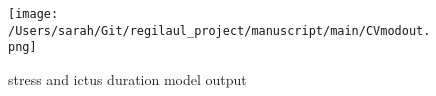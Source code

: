 



%




%
%


\begin{wrapfigure}{L}{0.5\textwidth}
\centering
\texttt{[image: /Users/sarah/Git/regilaul\_project/manuscript/main/CVmodout.png]}

\caption{stress and ictus duration model output}
\label{strickmdl}
\end{wrapfigure}


%

